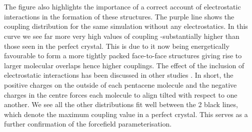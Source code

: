 \\\\
The figure also highlights the importance of a correct account of electrostatic interactions in the formation of these structures. The purple line shows the coupling distribution for the same simulation without any electrostatics. In this curve we see far more very high values of coupling -substantially higher than those seen in the perfect crystal. This is due to it now being energetically favourable to form a more tightly packed face-to-face structures giving rise to larger molecular overlaps hence higher couplings. The effect of the inclusion of electrostatic interactions has been discussed in other studies \cite{C7CE01700F, Ryno2014, Kafer2008}. In short, the positive charges on the outside of each pentacene molecule and the negative charges in the centre forces each molecule to align tilted with respect to one another. We see all the other distributions fit well between the 2 black lines, which denote the maximum coupling value in a perfect crystal. This serves as a further confirmation of the forcefield parameterisation.
